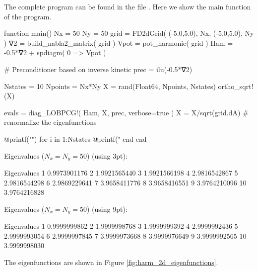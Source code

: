 The complete program can be found in the file .
Here we show the main function of the program.
%
\begin{juliacode}
function main()
  Nx = 50
  Ny = 50
  grid = FD2dGrid( (-5.0,5.0), Nx, (-5.0,5.0), Ny )
  ∇2 = build_nabla2_matrix( grid )
  Vpot = pot_harmonic( grid )
  Ham = -0.5*∇2 + spdiagm( 0 => Vpot )

  # Preconditioner based on inverse kinetic
  prec = ilu(-0.5*∇2)

  Nstates = 10
  Npoints = Nx*Ny
  X = rand(Float64, Npoints, Nstates)
  ortho_sqrt!(X)
    
  evals = diag_LOBPCG!( Ham, X, prec, verbose=true )
  X = X/sqrt(grid.dA) # renormalize the eigenfunctions

  @printf("\n\nEigenvalues\n")
  for i in 1:Nstates
    @printf("%
  end
end
\end{juliacode}

Eigenvalues ($N_{x} = N_{y} = 50$) (using 3pt):
\begin{textcode}
    Eigenvalues
    1       0.9973901176
    2       1.9921565440
    3       1.9921566198
    4       2.9816542867
    5       2.9816544298
    6       2.9869229641
    7       3.9658411776
    8       3.9658416551
    9       3.9764210096
   10       3.9764216828
\end{textcode}

Eigenvalues ($N_{x} = N_{y} = 50$) (using 9pt):
\begin{textcode}
    Eigenvalues
    1       0.9999999862
    2       1.9999998768
    3       1.9999999392
    4       2.9999992436
    5       2.9999993054
    6       2.9999997845
    7       3.9999973668
    8       3.9999976649
    9       3.9999992565
   10       3.9999998030
\end{textcode}

The eigenfunctions are shown in Figure \ref{fig:harm_2d_eigenfunctions}.

